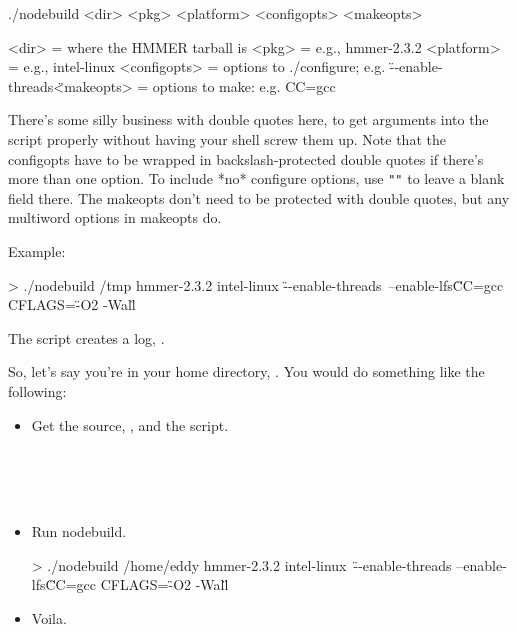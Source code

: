 \begin{sreoutput}
   ./nodebuild <dir> <pkg> <platform> <configopts> <makeopts>
   
   <dir>         = where the HMMER tarball is
   <pkg>         = e.g., hmmer-2.3.2
   <platform>    = e.g., intel-linux
   <configopts>  = options to ./configure; e.g. \"--enable-threads\"
   <makeopts>    = options to make: e.g. CC=gcc
\end{sreoutput}

There's some silly business with double quotes here, to get arguments
into the script properly without having your shell screw them up. Note
that the configopts have to be wrapped in backslash-protected double
quotes if there's more than one option. To include *no* configure
options, use \verb+""+ to leave a blank field there.  The makeopts
don't need to be protected with double quotes, but any multiword
options in makeopts do.

Example:

\begin{sreoutput}
     > ./nodebuild /tmp hmmer-2.3.2 intel-linux \"--enable-threads\
          --enable-lfs\" CC=gcc CFLAGS=\"-O2 -Wall\" 
\end{sreoutput}

The  script creates a log, .

So, let's say you're in your home directory, . You
would do something like the following:
   
\begin{itemize}
\item Get the source, , and the  script.

\\
\\
\\

\item Run nodebuild.

\begin{sreoutput}
     > ./nodebuild /home/eddy hmmer-2.3.2 intel-linux\
       \"--enable-threads --enable-lfs\" CC=gcc CFLAGS=\"-O2 -Wall\"
\end{sreoutput}

\item Voila.

\\
\\
\\
\\
\response{nodebuild}
\end{itemize}

